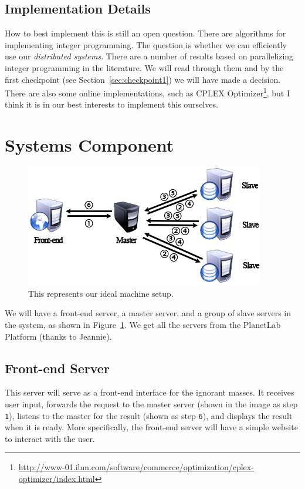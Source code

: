 \documentclass{article}
\begin{document}
\subsection{Implementation Details}

How to best implement this is still an open question. There are algorithms for implementing integer programming. The question is whether we
can efficiently use our \emph{distributed systems}. There are a number of results based on parallelizing integer programming in the literature. We
will read through them and by the first checkpoint (see Section~\ref{sec:checkpoint1}) we will have made a decision. There are also some online
implementations, such as CPLEX Optimizer\footnote{\url{http://www-01.ibm.com/software/commerce/optimization/cplex-optimizer/index.html}}, but I think
it is in our best interests to implement this ourselves.

\section{Systems Component}\label{sec:systems}

\begin{figure}[t]
\vskip 0.2in
\begin{center}
\centerline{\includegraphics[width=\columnwidth]{servers}}
\caption{This represents our ideal machine setup.}
\label{fig:machines}
\end{center}
\vskip -0.2in
\end{figure}

We will have a front-end server, a master server, and a group of slave servers in the system, as shown in Figure~\ref{fig:machines}. We get all the
servers from the PlanetLab Platform (thanks to Jeannie).

\subsection{Front-end Server}
This server will serve as a front-end interface for the ignorant masses. It receives user input, forwards the request to the master server (shown in
the image as step \texttt{1}), listens to the master for the result (shown as step \texttt{6}), and displays the result when it is ready. More
specifically, the front-end server will have a simple website to interact with the user.
\end{document}
